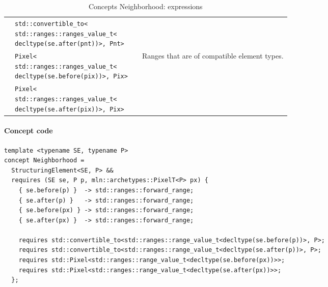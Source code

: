 \begin{table}[H]
\begin{scriptsize}
\begin{tabular}{llll}
      \multicolumn{1}{c|}{}                              & \makecell[l]{\texttt{std::convertible\_to<}                                                                                                              \\\texttt{std::ranges::ranges\_value\_t<}\\\texttt{decltype(se.after(pnt))>, Pnt>}}  &                                               &                                                                    \\
      \multicolumn{1}{c|}{}                              & \makecell[l]{\texttt{Pixel<}                                                                                                                             \\\texttt{std::ranges::ranges\_value\_t<}\\\texttt{decltype(se.before(pix))>, Pix>}}                 &                                               & \multirow{2}{*}{Ranges that are of compatible element types.}      \\
      \multicolumn{1}{c|}{}                              & \makecell[l]{\texttt{Pixel<}                                                                                                                             \\\texttt{std::ranges::ranges\_value\_t<}\\\texttt{decltype(se.after(pix))>, Pix>}}                  &                                               &                                                                    \\
      \cline{1-4}
    \end{tabular}
    \smallskip

    \caption{Concepts Neighborhood: expressions}
  \end{scriptsize}
  \label{table:concept.nbh.expressions}
\end{table}

\paragraph{Concept code}

\begin{verbatim}
template <typename SE, typename P>
concept Neighborhood =
  StructuringElement<SE, P> &&
  requires (SE se, P p, mln::archetypes::PixelT<P> px) {
    { se.before(p) }  -> std::ranges::forward_range;
    { se.after(p) }   -> std::ranges::forward_range;
    { se.before(px) } -> std::ranges::forward_range;
    { se.after(px) }  -> std::ranges::forward_range;

    requires std::convertible_to<std::ranges::range_value_t<decltype(se.before(p))>, P>;
    requires std::convertible_to<std::ranges::range_value_t<decltype(se.after(p))>, P>;
    requires std::Pixel<std::ranges::range_value_t<decltype(se.before(px))>>;
    requires std::Pixel<std::ranges::range_value_t<decltype(se.after(px))>>;
  };
\end{verbatim}

